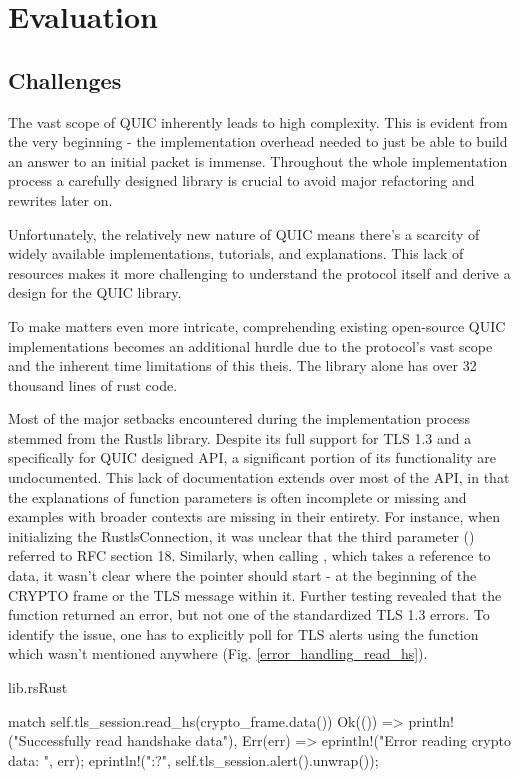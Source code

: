 \chapter{Evaluation}

\section{Challenges}
The vast scope of QUIC inherently leads to high complexity. This is evident from the very beginning - 
the implementation overhead needed to just be able to build an answer to an initial packet is immense.
Throughout the whole implementation process a carefully designed library is crucial to avoid major refactoring and
rewrites later on.

Unfortunately, the relatively new nature of QUIC means there's a scarcity of widely available implementations, tutorials,
and explanations.  This lack of resources makes it more challenging to understand the protocol itself and derive a design
for the QUIC library.

To make matters even more intricate, comprehending existing open-source QUIC implementations becomes an additional hurdle due
to the protocol's vast scope and the inherent time limitations of this theis. The  library alone has over
32 thousand lines of rust code.

Most of the major setbacks encountered during the implementation process stemmed from the Rustls library. Despite its full support for 
TLS 1.3 and a specifically for QUIC designed API, a significant portion of its functionality are undocumented. This lack of documentation
extends over most of the API, in that the explanations of function parameters is often incomplete or missing and examples with
broader contexts are missing in their entirety.
For instance, when initializing the RustlsConnection, it was unclear that the third parameter () referred to
RFC section 18. Similarly, when calling , which takes a reference to data, it wasn't clear where the
pointer should start - at the beginning of the CRYPTO frame or the TLS message within it. Further testing revealed that
the function returned an error, but not one of the standardized TLS 1.3 errors. To identify the issue, one has to explicitly
poll for TLS alerts using the  function which wasn't mentioned anywhere (Fig. \ref{error_handling_read_hs}).

\begin{codeblock}{lib.rs}{Rust}
    \begin{rustcode}
        match self.tls_session.read_hs(crypto_frame.data()) {
            Ok(()) => println!("Successfully read handshake data"),
            Err(err) => {
                eprintln!("Error reading crypto data: {}", err);
                eprintln!("{:?}", self.tls_session.alert().unwrap());
            }
        }
    \end{rustcode}
    \label{error_handling_read_hs}
\end{codeblock}

